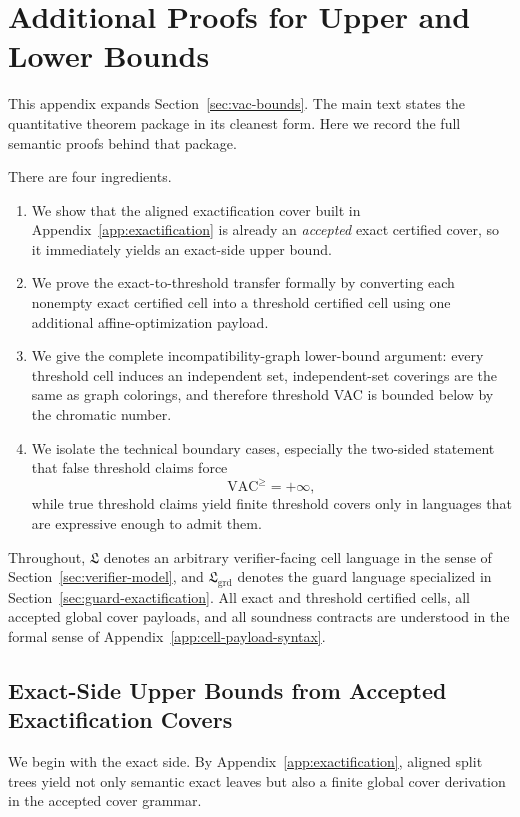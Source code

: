 \section{Additional Proofs for Upper and Lower Bounds}
\label{app:vac-bounds}

This appendix expands Section~\ref{sec:vac-bounds}. The main text states the quantitative theorem package in its cleanest form. Here we record the full semantic proofs behind that package.

There are four ingredients.
\begin{enumerate}
    \item We show that the aligned exactification cover built in Appendix~\ref{app:exactification} is already an \emph{accepted} exact certified cover, so it immediately yields an exact-side upper bound.
    \item We prove the exact-to-threshold transfer formally by converting each nonempty exact certified cell into a threshold certified cell using one additional affine-optimization payload.
    \item We give the complete incompatibility-graph lower-bound argument: every threshold cell induces an independent set, independent-set coverings are the same as graph colorings, and therefore threshold VAC is bounded below by the chromatic number.
    \item We isolate the technical boundary cases, especially the two-sided statement that false threshold claims force
    \[
    \mathrm{VAC}^{\ge}=+\infty,
    \]
    while true threshold claims yield finite threshold covers only in languages that are expressive enough to admit them.
\end{enumerate}

Throughout, $\mathfrak L$ denotes an arbitrary verifier-facing cell language in the sense of Section~\ref{sec:verifier-model}, and $\mathfrak L_{\mathrm{grd}}$ denotes the guard language specialized in Section~\ref{sec:guard-exactification}. All exact and threshold certified cells, all accepted global cover payloads, and all soundness contracts are understood in the formal sense of Appendix~\ref{app:cell-payload-syntax}.

\subsection{Exact-Side Upper Bounds from Accepted Exactification Covers}

We begin with the exact side. By Appendix~\ref{app:exactification}, aligned split trees yield not only semantic exact leaves but also a finite global cover derivation in the accepted cover grammar.


